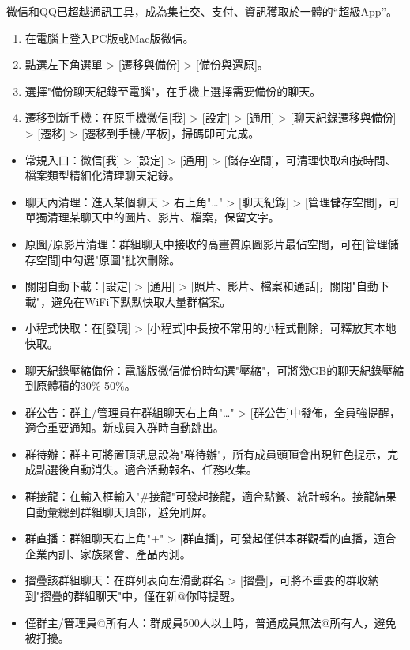 
微信和QQ已超越通訊工具，成為集社交、支付、資訊獲取於一體的“超級App”。


\begin{enumerate}
  \item 在電腦上登入PC版或Mac版微信。
  \item 點選左下角選單 > [遷移與備份] > [備份與還原]。
  \item 選擇"備份聊天紀錄至電腦"，在手機上選擇需要備份的聊天。
  \item 遷移到新手機：在原手機微信[我] > [設定] > [通用] > [聊天紀錄遷移與備份] > [遷移] > [遷移到手機/平板]，掃碼即可完成。
\end{enumerate}


\begin{itemize}
  \item 常規入口：微信[我] > [設定] > [通用] > [儲存空間]，可清理快取和按時間、檔案類型精細化清理聊天紀錄。
  \item 聊天內清理：進入某個聊天 > 右上角"…" > [聊天紀錄] > [管理儲存空間]，可單獨清理某聊天中的圖片、影片、檔案，保留文字。
  \item 原圖/原影片清理：群組聊天中接收的高畫質原圖影片最佔空間，可在[管理儲存空間]中勾選"原圖"批次刪除。
  \item 關閉自動下載：[設定] > [通用] > [照片、影片、檔案和通話]，關閉"自動下載"，避免在WiFi下默默快取大量群檔案。
  \item 小程式快取：在[發現] > [小程式]中長按不常用的小程式刪除，可釋放其本地快取。
  \item 聊天紀錄壓縮備份：電腦版微信備份時勾選"壓縮"，可將幾GB的聊天紀錄壓縮到原體積的30\%-50\%。
\end{itemize}


\begin{itemize}
  \item 群公告：群主/管理員在群組聊天右上角"…" > [群公告]中發佈，全員強提醒，適合重要通知。新成員入群時自動跳出。
  \item 群待辦：群主可將置頂訊息設為"群待辦"，所有成員頭頂會出現紅色提示，完成點選後自動消失。適合活動報名、任務收集。
  \item 群接龍：在輸入框輸入"\#接龍"可發起接龍，適合點餐、統計報名。接龍結果自動彙總到群組聊天頂部，避免刷屏。
  \item 群直播：群組聊天右上角"+" > [群直播]，可發起僅供本群觀看的直播，適合企業內訓、家族聚會、產品內測。
  \item 摺疊該群組聊天：在群列表向左滑動群名 > [摺疊]，可將不重要的群收納到"摺疊的群組聊天"中，僅在新@你時提醒。
  \item 僅群主/管理員@所有人：群成員500人以上時，普通成員無法@所有人，避免被打擾。
\end{itemize}

